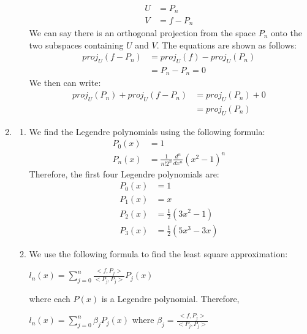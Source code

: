 \documentclass{article}
\begin{document}
\begin{enumerate}
\begin{enumerate}
            \begin{align*}
                U &= P_n \\
                V &= f-P_n
            \end{align*}
            We can say there is an orthogonal projection from the space $P_n$ onto the two subspaces containing $U$ and $V$. The equations are shown as follows:
            \begin{align*}
                proj_U(f-P_n) &= proj_U(f) - proj_U(P_n) \\
                              &= P_n - P_n = 0
            \end{align*}
            We then can write:
            \begin{align*}
                proj_U(P_n) + proj_U(f-P_n) &= proj_U(P_n) + 0 \\
                                            &= proj_U(P_n)
            \end{align*}
        \end{enumerate}
    \item %
        \begin{enumerate}
            \item
            We find the Legendre polynomials using the following formula:
            \begin{align*}
                P_0(x) &= 1 \\
                P_n(x) &= \frac{1}{n!2^n}\frac{d^n}{dx^n}(x^2-1)^n
            \end{align*}
            Therefore, the first four Legendre polynomials are:
            \begin{align*}
                P_0(x) &= 1 \\
                P_1(x) &= x \\
                P_2(x) &= \frac{1}{2}(3x^2-1) \\
                P_3(x) &= \frac{1}{2}(5x^3-3x)
            \end{align*}
            \item
            We use the following formula to find the least square approximation: 
            \begin{center}
                $ l_n(x) = \sum_{j=0}^{n} \frac{<f,P_j>}{<P_j,P_j>}P_j(x) $
            \end{center}
            where each $ P(x)$ is a Legendre polynomial. Therefore,
            \begin{center}
                $ l_n(x) = \sum_{j=0}^{n} \beta_jP_j(x) $ where $ \beta_j = \frac{<f,P_j>}{<P_j,P_j>}$

\end{center}
\end{enumerate}
\end{enumerate}
\end{document}

